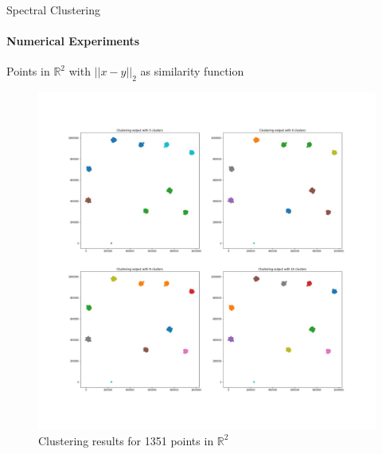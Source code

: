 \documentclass[10pt,a4paper, nocenter]{beamer}
\begin{document}
	\begin{frame}{Spectral Clustering}
		\framesubtitle{Numerical Experiments}
		Points in $\mathbb{R}^2$ with $\lvert\lvert x-y \rvert\rvert_2$ as similarity function
		\begin{figure}[h]
        \includegraphics[height=0.65\textheight]{../../images/2DCluster.jpg}
		\caption{Clustering results for 1351 points in $\mathbb{R}^2$}
		\label{fig:2dresults}
		\end{figure}
	\end{frame}
	
\end{document}
